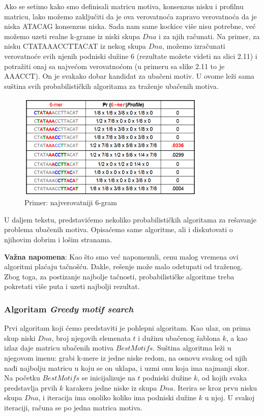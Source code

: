  Ako se setimo kako smo definisali matricu motiva, konsenzus nisku i profilnu matricu, lako možemo zaključiti da je ova verovatnoća zapravo verovatnoća da je niska ATACAG konsenzus niska. Sada nam same kockice više nisu potrebne, već možemo uzeti realne k-grame iz niski skupa $Dna$ i za njih računati. Na primer, za nisku CTATAAACCTTACAT iz nekog skupa $Dna$, možemo izračunati verovatnoće svih njenih podniski dužine 6 (rezultate možete videti na slici 2.11) i potražiti onaj sa najvećom verovatnoćom (u primeru sa slike 2.11 to je AAACCT). On je svakako dobar kandidat za ubačeni motiv. U ovome leži sama suština svih probabilističkih algoritama za traženje ubačenih motiva.

\begin{figure}[h]
\caption{Primer: najverovatniji 6-gram}
\centering
\includegraphics[width=0.8\textwidth]{poglavlja/2/slike/63-2.PNG}
\end{figure}

U daljem tekstu, predstavićemo nekoliko probabilističkih algoritama za rešavanje problema ubačenih motiva. Opisaćemo same algoritme, ali i diskutovati o njihovim dobrim i lošim stranama.

\noindent \textbf{Važna napomena}: Kao što smo već napomenuli, cenu malog vremena ovi algoritmi plaćaju tačnošću. Dakle, rešenje može malo odstupati od traženog. Zbog toga, za postizanje najbolje tačnosti, probabilističke algoritme treba pokretati više puta i uzeti najbolji rezultat.

\subsubsection{Algoritam \textit{Greedy motif search}}
Prvi algoritam koji ćemo predstaviti je pohlepni algoritam. Kao ulaz, on prima skup niski $Dna$, broj njegovih elemenata $t$ i dužinu ubačenog šablona $k$, a kao izlaz daje matricu ubačenih motiva $BestMotifs$. Suština algoritma leži u njegovom imenu: grabi k-mere iz jedne niske redom, na osnovu svakog od njih nađi najbolju matricu u koju se on uklapa, i uzmi onu koja ima najmanji skor.
Na početku $BestMotifs$ se inicijalizuje na $t$ podniski dužine $k$, od kojih svaka predstavlja prvih $k$ karakera jedne niske iz skupa $Dna$. Iterira se kroz prvu nisku skupa $Dna$, i iteracija ima onoliko koliko ima podniski dužine $k$ u njoj. U svakoj iteraciji, računa se po jedna matrica motiva. 

